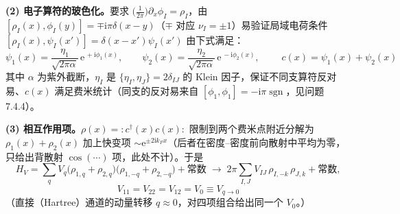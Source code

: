 \textbf{(2) 电子算符的玻色化。}要求 $\big(\frac{1}{2\pi}\big)\partial_x\phi_I=\rho_I$，由 $[\rho_I(x),\phi_I(y)]=\mp\mathrm{i}\pi\delta(x-y)$（$\mp$ 对应 $\nu_I=\pm1$）易验证局域电荷条件 $[\rho_I(x),\psi_I(x')]=\delta(x-x')\psi_I(x')$ 由下式满足：
\begin{equation*}
\psi_1(x)=\frac{\eta_1}{\sqrt{2\pi\alpha}}\,\mathrm{e}^{\,+\mathrm{i}\phi_1(x)},
\qquad
\psi_2(x)=\frac{\eta_2}{\sqrt{2\pi\alpha}}\,\mathrm{e}^{\,-\mathrm{i}\phi_2(x)},
\qquad
\boxed{\;c(x)=\psi_1(x)+\psi_2(x)\;}
\end{equation*}
其中 $\alpha$ 为紫外截断，$\eta_I$ 是 $\{\eta_I,\eta_J\}=2\delta_{IJ}$ 的 Klein 因子，保证不同支算符反对易、$c(x)$ 满足费米统计（同支的反对易来自 $[\phi_1,\phi_1]=-\mathrm{i}\pi\operatorname{sgn}$，见问题 7.4.4）。

\textbf{(3) 相互作用项。}$\rho(x)=:\!c^{\dagger}(x)c(x)\!:$ 限制到两个费米点附近分解为 $\rho_1(x)+\rho_2(x)$ 加上快变项 $\sim\mathrm{e}^{\pm2\mathrm{i}k_Fx}$（后者在密度--密度前向散射中平均为零，只给出背散射 $\cos(\cdots)$ 项，此处不计）。于是
\begin{equation*}
H_V=\sum_q V_q\big(\rho_{1,q}+\rho_{2,q}\big)\big(\rho_{1,-q}+\rho_{2,-q}\big)+\text{常数}
\;\longrightarrow\;
2\pi\sum_{I,J}V_{IJ}\,\rho_{I,-k}\,\rho_{J,k}+\text{常数} ,
\end{equation*}
\begin{equation*}
\boxed{\;V_{11}=V_{22}=V_{12}=V_0\equiv V_{q\to0}\;}
\end{equation*}
（直接（Hartree）通道的动量转移 $q\approx0$，对四项组合给出同一个 $V_0$。）

